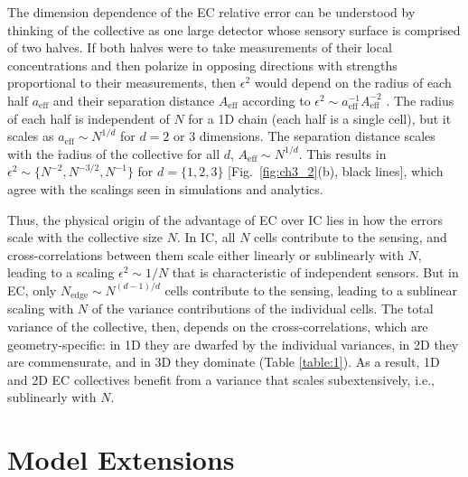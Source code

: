 The dimension dependence of the EC relative error can be understood by thinking of the collective as one large detector whose sensory surface is comprised of two halves. If both halves were to take measurements of their local concentrations and then polarize in opposing directions with strengths proportional to their measurements, then $\epsilon^2$ would depend on the radius of each half
$a_\text{eff}$
and their separation distance
$A_\text{eff}$ according to $\epsilon^2  \sim a^{-1}_\text{eff}A^{-2}_\text{eff}$ \cite{mugler2016limits}.
The radius of each half is independent of $N$ for a 1D chain (each half is a single cell), but it scales as
$a_\text{eff} \sim N^{1/d}$ for $d = 2$ or $3$ dimensions.
The separation distance scales with the \r{radius} of the collective for all $d$,
$A_\text{eff} \sim N^{1/d}$. This results in
$\epsilon^2 \sim \{N^{-2}, N^{-3/2}, N^{-1}\}$ for $d=\{1,2,3\}$ [Fig.\ \ref{fig:ch3_2}(b), black lines],
which agree with the scalings seen in simulations and analytics.

Thus, the physical origin of the advantage of EC over IC lies in how the errors scale with the collective size $N$. In IC, all $N$ cells contribute to the sensing, and cross-correlations between them scale either linearly or sublinearly with $N$, leading to a scaling $\epsilon^2 \sim 1/N$ that is characteristic of independent sensors. But in EC, only $N_\text{edge} \sim N^{(d-1)/d}$ cells contribute to the sensing, leading to a sublinear scaling with $N$ of the variance contributions of the individual cells. The total variance of the collective, then, depends on the cross-correlations, which are geometry-specific: in 1D they are dwarfed by the individual variances, in 2D they are commensurate, and in 3D they dominate (Table \ref{table:1}). As a result, 1D and 2D EC collectives benefit from a variance that scales subextensively, i.e., sublinearly with $N$.

\section{Model Extensions}

